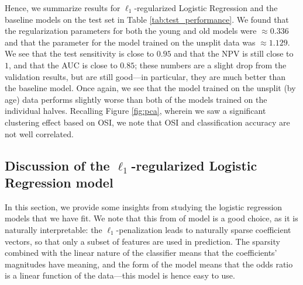 \documentclass[11pt, letterpaper]{amsart}
\let\Oldsubsection\subsection
\renewcommand{\subsection}{\FloatBarrier\Oldsubsection}
\begin{document}
Hence, we summarize results for $\ell_1$-regularized Logistic Regression and the baseline models on the test set in Table \ref{tab:test_performance}. We found that the regularization parameters for both the young and old models were $\approx 0.336$ and that the parameter for the model trained on the unsplit data was $\approx 1.129$. We see that the test sensitivity is close to $0.95$ and that the NPV is still close to $1$, and that the AUC is close to $0.85$; these numbers are a slight drop from the validation results, but are still good---in particular, they are much better than the baseline model. Once again, we see that the model trained on the unsplit (by age) data performs slightly worse than both of the models trained on the individual halves. Recalling Figure \ref{fig:pca}, wherein we saw a significant clustering effect based on OSI, we note that OSI and classification accuracy are not well correlated. 
\begin{table}[h]
\caption{Algorithm performance on test data for each data split}\label{tab:test_performance}
\end{table}

\subsection{Discussion of the $\ell_1$-regularized Logistic Regression model} \label{ssec:discuss}

In this section, we provide some insights from studying the logistic regression models that we have fit. We note that this from of model is a good choice, as it is naturally interpretable: the $\ell_1$-penalization leads to naturally sparse coefficient vectors, so that only a subset of features are used in prediction. The sparsity combined with the linear nature of the classifier means that the coefficients' magnitudes have meaning, and the form of the model means that the odds ratio is a linear function of the data---this model is hence easy to use. 
\end{document}
